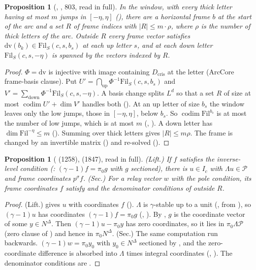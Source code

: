 \documentclass[11pt]{article}
\newcommand{\NN}{N^{\Delta}}
\newcommand{\Pp}{\mathcal P}
\newcommand{\Fil}{\mathrm{Fil}}
\newtheorem{prop}[lemma]{Proposition}
\theoremstyle{definition}
\theoremstyle{remark}
\begin{document}
\begin{prop}[, , 803, read in full]
In the window, with every thick letter having at most $m$ jumps in $[-\eta,\eta]$ (), there are a horizontal frame $b$ at the start of the arc and a set $R$ of frame indices with $|R|\le m\cdot\rho$, where $\rho$ is the number of thick letters of the arc. Outside $R$ every frame vector satisfies $\mathrm{dv}(b_k)\in\Fil_S(c,s,b_s)$ at each up letter $s$, and at each down letter $\Fil_S(c,s,-\eta)$ is spanned by the vectors indexed by $R$.
\end{prop}
\begin{proof}
$\Phi=\mathrm{dv}$ is injective with image containing $D_{\mathrm{cris}}$ at the letter ($\mathrm{ArcCore}$ frame-basis clause). Put $U'=\bigcap_{\text{up}}\Phi^{-1}\Fil_S(c,s,b_s)$ and $V'=\sum_{\text{down}}\Phi^{-1}\Fil_S(c,s,-\eta)$. A basis change splits $L^d$ so that a set $R$ of size at most $\operatorname{codim}U'+\dim V'$ handles both (). At an up letter of size $b_s$ the window leaves only the low jumps, those in $[-\eta,\eta]$, below $b_s$. So $\operatorname{codim}\Fil^{b_s}$ is at most the number of low jumps, which is at most $m$ (, ). A down letter has $\dim\Fil^{-\eta}\le m$ (). Summing over thick letters gives $|R|\le m\rho$. The frame is changed by an invertible matrix () and re-solved ().
\end{proof}

\begin{prop}[ (1258),  (1847), read in full]
(Lift.) If $f$ satisfies the inverse-level condition (: $(\gamma-1)f=\pi_0g$ with $g$ sectioned), there is $u\in I_c$ with $\Lambda u\in\Pp$ and frame coordinates $p^\sigma f$. (Sec.) For a relay vector $w$ with the pole condition, its frame coordinates $f$ satisfy  and the denominator conditions of  outside $R$.
\end{prop}
\begin{proof}
(Lift.)  gives $u$ with coordinates $f$ (). $\Lambda$ is $\gamma$-stable up to a unit (, from ), so $(\gamma-1)u$ has coordinates $(\gamma-1)f=\pi_0g$ (, ). By , $g$ is the coordinate vector of some $y\in\NN$. Then $(\gamma-1)u-\pi_0y$ has zero coordinates, so it lies in $\pi_0\Lambda\Pp$ (zero clause of ) and hence in $\pi_0\NN$. (Sec.) The same computation run backwards. $(\gamma-1)w=\pi_0y_0$ with $y_0\in\NN$ sectioned by , and the zero-coordinate difference is absorbed into $\Lambda$ times integral coordinates (, ). The denominator conditions are .
\end{proof}
\end{document}
